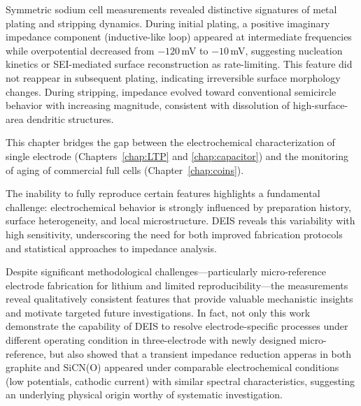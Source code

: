 Symmetric sodium cell measurements revealed distinctive signatures of metal plating and stripping dynamics. During initial plating, a positive imaginary impedance component (inductive-like loop) appeared at intermediate frequencies while overpotential decreased from $-120$\,mV to $-10$\,mV, suggesting nucleation kinetics or SEI-mediated surface reconstruction as rate-limiting. This feature did not reappear in subsequent plating, indicating irreversible surface morphology changes. During stripping, impedance evolved toward conventional semicircle behavior with increasing magnitude, consistent with dissolution of high-surface-area dendritic structures.

This chapter bridges the gap between the electrochemical characterization of single electrode (Chapters~\ref{chap:LTP} and \ref{chap:capacitor}) and the monitoring of aging of commercial full cells (Chapter~\ref{chap:coins}). 

The inability to fully reproduce certain features highlights a fundamental challenge: electrochemical behavior is strongly influenced by preparation history, surface heterogeneity, and local microstructure. DEIS reveals this variability with high sensitivity, underscoring the need for both improved fabrication protocols and statistical approaches to impedance analysis.

Despite significant methodological challenges—particularly micro-reference electrode fabrication for lithium and limited reproducibility—the measurements reveal qualitatively consistent features that provide valuable mechanistic insights and motivate targeted future investigations.
In fact, not only this work demonstrate the capability of DEIS to resolve electrode-specific processes under different operating condition in three-electrode with newly designed micro-reference, but also showed that a transient impedance reduction apperas in both graphite and SiCN(O) appeared under comparable electrochemical conditions (low potentials, cathodic current) with similar spectral characteristics, suggesting an underlying physical origin worthy of systematic investigation.